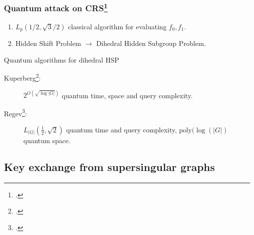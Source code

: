 \documentclass{beamer}
\begin{document}

\begin{frame}
  \frametitle{Quantum attack on CRS\footcite{childs+jao+soukharev10}}

  \begin{enumerate}
  \item \alert{$L_p(1/2,\sqrt{3}/2)$} classical algorithm for
    evaluating $f_0,f_1$.
  \item Hidden Shift Problem $\to$ Dihedral Hidden
    Subgroup Problem.
  \end{enumerate}
  
  \begin{block}{Quantum algorithms for dihedral HSP}
    \begin{description}
    \item[Kuperberg\footcite{Kup}:] \alert{$2^{O(\sqrt{\log|G|})}$}
      quantum time, space and query complexity.
    \item[Regev\footcite{regev04}:]
      \alert{$L_{|G|}(\frac{1}{2},\sqrt{2})$} quantum time and query
      complexity, \alert{$\text{poly}(\log(|G|)$} quantum space.
    \end{description}
  \end{block}
\end{frame}


\subsection{Key exchange from supersingular graphs}
\end{document}
